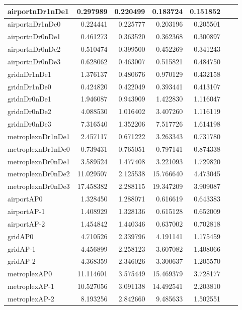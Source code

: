 \begin{longtable}{|l|r|r|r|r|r|r|}
\endlastfoot
airportnDr1nDe1 & 0.297989 & 0.220499 & 0.183724 & 0.151852 \\ \hline
airportnDr1nDe0 & 0.224441 & 0.225777 & 0.203196 & 0.205501 \\ \hline
airportnDr0nDe1 & 0.461273 & 0.363520 & 0.362368 & 0.300897 \\ \hline
airportnDr0nDe2 & 0.510474 & 0.399500 & 0.452269 & 0.341243 \\ \hline
airportnDr0nDe3 & 0.628062 & 0.463007 & 0.515821 & 0.484750 \\ \hline
gridnDr1nDe1 & 1.376137 & 0.480676 & 0.970129 & 0.432158 \\ \hline
gridnDr1nDe0 & 0.424820 & 0.422049 & 0.393441 & 0.413107 \\ \hline
gridnDr0nDe1 & 1.946087 & 0.943909 & 1.422830 & 1.116047 \\ \hline
gridnDr0nDe2 & 4.088530 & 1.016402 & 3.407260 & 1.116119 \\ \hline
gridnDr0nDe3 & 7.316540 & 1.352206 & 7.517726 & 1.614198 \\ \hline
metroplexnDr1nDe1 & 2.457117 & 0.671222 & 3.263343 & 0.731780 \\ \hline
metroplexnDr1nDe0 & 0.739431 & 0.765051 & 0.797141 & 0.874338 \\ \hline
metroplexnDr0nDe1 & 3.589524 & 1.477408 & 3.221093 & 1.729820 \\ \hline
metroplexnDr0nDe2 & 11.029507 & 2.125538 & 15.766640 & 4.473045 \\ \hline
metroplexnDr0nDe3 & 17.458382 & 2.288115 & 19.347209 & 3.909087 \\ \hline
airportAP0 & 1.328450 & 1.288071 & 0.616619 & 0.643383 \\ \hline
airportAP-1 & 1.408929 & 1.328136 & 0.615128 & 0.652009 \\ \hline
airportAP-2 & 1.454842 & 1.440346 & 0.637002 & 0.702818 \\ \hline
gridAP0 & 4.710526 & 2.339796 & 4.191141 & 1.175459 \\ \hline
gridAP-1 & 4.456899 & 2.258123 & 3.607082 & 1.408066 \\ \hline
gridAP-2 & 4.368359 & 2.346026 & 3.300637 & 1.205570 \\ \hline
metroplexAP0 & 11.114601 & 3.575449 & 15.469379 & 3.728177 \\ \hline
metroplexAP-1 & 10.527056 & 3.091138 & 14.492541 & 2.203810 \\ \hline
metroplexAP-2 & 8.193256 & 2.842660 & 9.485633 & 1.502551 \\ \hline

\end{longtable}
